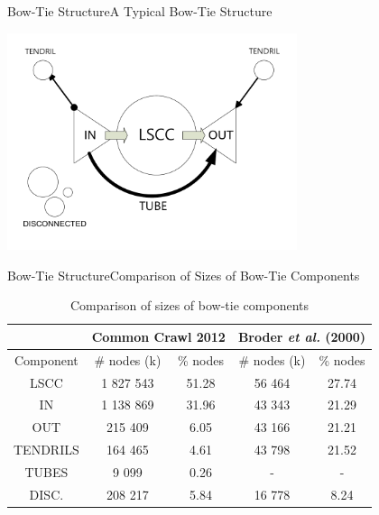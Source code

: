 \documentclass{beamer}
\begin{document}
  \begin{frame}{Bow-Tie Structure}{A Typical Bow-Tie Structure}
    \begin{center}
    \includegraphics[width = 8.5cm]{bow-tie-structure.pdf}
    \end{center}
  \end{frame}

  \begin{frame}{Bow-Tie Structure}{Comparison of Sizes of Bow-Tie Components}
    \begin{center}
    \begin{table}
    \begin{tabular}{|c|c|c|c|c|}
      \hline
        &  \multicolumn{2}{c|}{Common Crawl 2012}  &  \multicolumn{2}{c|}{Broder \emph{et al.} (2000)}  \\ \hline
      Component & \# nodes (k) & \% nodes &  \# nodes (k) & \% nodes \\ \hline
      LSCC & 1 827 543 & 51.28 & 56 464 & 27.74    \\
      IN & 1 138 869 & 31.96 & 43 343 & 21.29   \\
      OUT & 215 409 & 6.05 & 43 166 & 21.21  \\
      TENDRILS & 164 465 & 4.61 & 43 798 & 21.52  \\
      TUBES & 9 099 & 0.26 & - & - \\
      DISC. & 208 217 & 5.84 & 16 778 & 8.24 \\ \hline
    \end{tabular}
    \caption{Comparison of sizes of bow-tie components}
    \end{table}
    \end{center}
  \end{frame}
\end{document}
